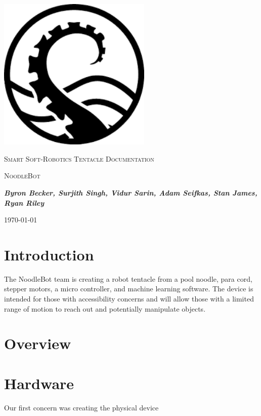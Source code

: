 \documentclass[12pt,a4paper]{article}
\begin{document}
\begin{titlepage}
	\centering
	\includegraphics[width=0.55\textwidth]{tentacle.png}\par\vspace{1cm}
	{\scshape\LARGE Smart Soft-Robotics Tentacle Documentation\par}
	\vspace{1cm}
	{\scshape\Large NoodleBot\par}
	\vspace{1.5cm}
	{\itshape \textbf{Byron Becker, Surjith Singh, Vidur Sarin, Adam Seifkas, Stan James, Ryan Riley}\par}
	{\large \today\par}
\end{titlepage}

\tableofcontents

\newpage
\section{Introduction}

The NoodleBot team is creating a robot tentacle from a pool noodle, para cord, stepper motors, a micro controller, and machine learning software. The device is intended for those with accessibility concerns and will allow those with a limited range of motion to reach out and potentially manipulate objects.

\section{Overview}


\section{Hardware}

Our first concern was creating the physical device
\end{document}
